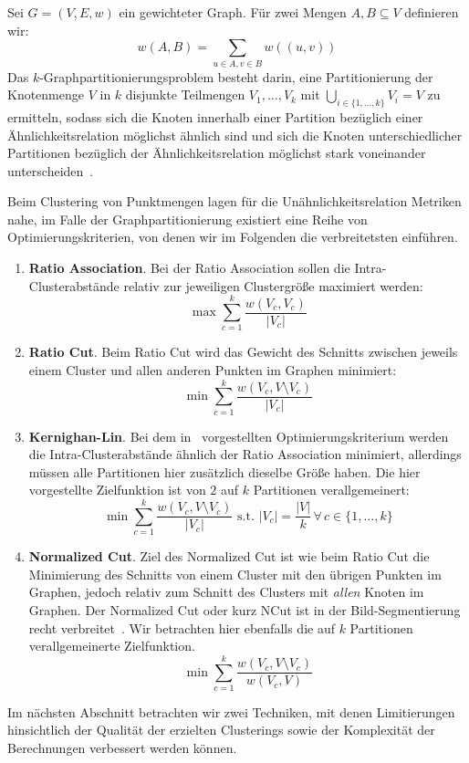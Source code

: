 \begin{definition}[$k$-Graphpartitionierung]
\label{def:graphpartitioning}
	Sei $G=(V,E,w)$ ein gewichteter Graph. Für zwei Mengen $A, B \subseteq V$ definieren wir:
	\[ w(A,B) = \sum_{u \in A, v \in B} w((u,v)) \]
	Das $k$-Graphpartitionierungsproblem besteht darin, eine Partitionierung der Knotenmenge $V$ in $k$ disjunkte Teilmengen
	$V_1, \dots, V_k$ mit $\bigcup_{i \in \{1, \dots, k \}} V_i = V$ zu ermitteln, sodass sich die Knoten innerhalb einer
	Partition bezüglich einer Ähnlichkeitsrelation möglichst ähnlich sind und sich die Knoten unterschiedlicher Partitionen
	bezüglich der Ähnlichkeitsrelation möglichst stark voneinander unterscheiden~\cite{KernighanL70}.
	
	Beim Clustering von Punktmengen lagen für die Unähnlichkeitsrelation Metriken nahe, im Falle der Graphpartitionierung
	existiert eine Reihe von Optimierungskriterien, von denen wir im Folgenden die verbreitetsten einführen.
	
	\begin{enumerate}
		\item 	\textbf{Ratio Association}. Bei der Ratio Association sollen die Intra-Clusterabstände relativ zur jeweiligen
				Clustergröße maximiert werden:
				\[ \max \sum_{c=1}^{k} \frac{w(V_c, V_c)}{\left|V_c\right|} \]
		\item 	\textbf{Ratio Cut}. Beim Ratio Cut wird das Gewicht des Schnitts zwischen jeweils einem Cluster und allen
				anderen Punkten im Graphen minimiert:
				\[ \min \sum_{c=1}^{k} \frac{w(V_c, V \setminus V_c)}{\left|V_c\right|} \]
		\item 	\textbf{Kernighan-Lin}. Bei dem in~\cite{KernighanL70} vorgestellten Optimierungskriterium werden die
				Intra-Clusterabstände ähnlich der Ratio Association minimiert, allerdings müssen alle Partitionen hier zusätzlich
				dieselbe Größe haben. Die hier vorgestellte Zielfunktion ist von $2$ auf $k$ Partitionen verallgemeinert:
				\[ \min \sum_{c=1}^{k} \frac{w(V_c, V \setminus V_c)}{\left|V_c\right|} \textrm{ s.t. } 
				   \left|V_c\right| = \frac{\left|V\right|}{k} \, \forall \, c \in \{ 1, \dots, k \} \]
		\item 	\textbf{Normalized Cut}. Ziel des Normalized Cut ist wie beim Ratio Cut die Minimierung des Schnitts von einem
				Cluster mit den übrigen Punkten im Graphen, jedoch relativ zum Schnitt des Clusters mit \emph{allen}
				Knoten im Graphen. Der Normalized Cut oder kurz NCut ist in der Bild-Segmentierung recht verbreitet~\cite{ShiM00}.
				Wir betrachten hier ebenfalls die auf $k$ Partitionen verallgemeinerte Zielfunktion.
				\[ \min \sum_{c=1}^{k} \frac{w(V_c, V \setminus V_c)}{w(V_c, V)} \]
	\end{enumerate}
\end{definition}
Im nächsten Abschnitt betrachten wir zwei Techniken, mit denen Limitierungen hinsichtlich der Qualität der erzielten Clusterings
sowie der Komplexität der Berechnungen verbessert werden können.

